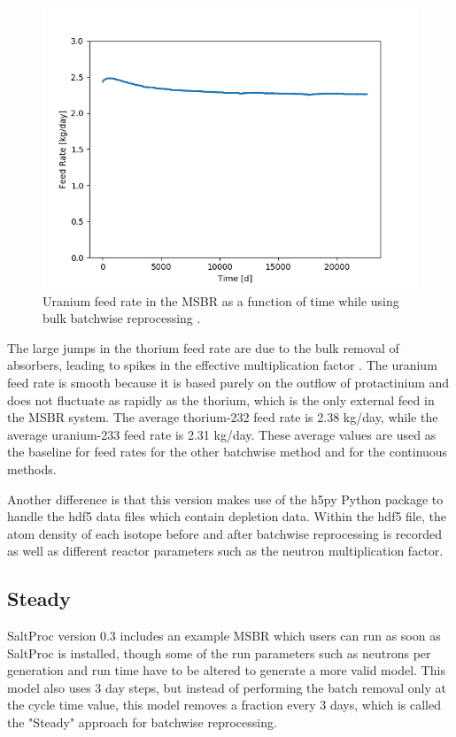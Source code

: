 \begin{figure}[H]
  \centering
  \includegraphics[scale=0.7]{images/Pa233rem_massv01.png}
  \caption{Uranium feed rate in the MSBR as a function of time while using bulk batchwise reprocessing \cite{rykhlevskii_advanced_2018}.}
   \label{fig:U-feed-v1}
\end{figure}

The large jumps in the thorium feed rate are due to the bulk removal of absorbers, leading to spikes in the effective multiplication factor \cite{rykhlevskii_advanced_2018}. The uranium feed rate is smooth because it is based purely on the outflow of protactinium and does not fluctuate as rapidly as the thorium, which is the only external feed in the MSBR system. The average thorium-232 feed rate is 2.38 kg/day, while the average uranium-233 feed rate is 2.31 kg/day. These average values are used as the baseline for feed rates for the other batchwise method and for the continuous methods.

Another difference is that this version makes use of the h5py Python package to handle the hdf5 data files which contain depletion data. Within the hdf5 file, the atom density of each isotope before and after batchwise reprocessing is recorded as well as different reactor parameters such as the neutron multiplication factor.

\subsection{Steady}

SaltProc version 0.3 includes an example MSBR which users can run as soon as SaltProc is installed, though some of the run parameters such as neutrons per generation and run time have to be altered to generate a more valid model. This model also uses 3 day steps, but instead of performing the batch removal only at the cycle time value, this model removes a fraction every 3 days, which is called the "Steady" approach for batchwise reprocessing.

